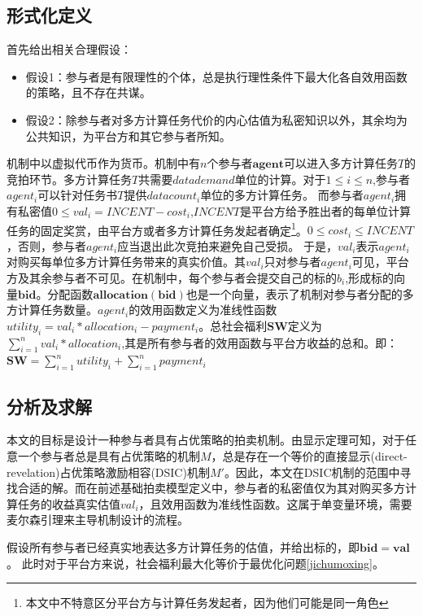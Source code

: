 \documentclass[promaster]{thesis-uestc}
\begin{document}
\subsection{形式化定义}
\label{jichumoxingdingyi}
首先给出相关合理假设：
\begin{itemize}
    \item 假设1：参与者是有限理性的个体，总是执行理性条件下最大化各自效用函数的策略，且不存在共谋。
    \item 假设2：除参与者对多方计算任务代价的内心估值为私密知识以外，其余均为公共知识，为平台方和其它参与者所知。
\end{itemize}

机制中以虚拟代币作为货币。机制中有$n$个参与者$\mathbf{agent}$可以进入多方计算任务$T$的竞拍环节。多方计算任务$T$共需要$datademand$单位的计算。对于$1\leq i\leq n$,参与者$agent_i$可以针对任务书$T$提供$datacount_i$单位的多方计算任务。
而参与者$agent_i$拥有私密值$0 \leq val_i = INCENT-cost_i$,$INCENT$是平台方给予胜出者的每单位计算任务的固定奖赏，由平台方或者多方计算任务发起者确定\footnote{本文中不特意区分平台方与计算任务发起者，因为他们可能是同一角色}。$0 \leq cost_i \leq INCENT$，否则，参与者$agent_i$应当退出此次竞拍来避免自己受损。 于是，$val_i$表示$agent_i$对购买每单位多方计算任务带来的真实价值。其$val_i$只对参与者$agent_i$可见，平台方及其余参与者不可见。在机制中，每个参与者会提交自己的标的$b_i$,形成标的向量$\mathbf{bid}$。分配函数$\mathbf{allocation}(\mathbf{bid})$也是一个向量，表示了机制对参与者分配的多方计算任务数量。$agent_i$的效用函数定义为准线性函数$utility_i = val_i*allocation_i-payment_i$。总社会福利$\mathbf{SW}$定义为$\sum_{i=1}^n{val_i*allocation_i}$,其是所有参与者的效用函数与平台方收益的总和。即：$\mathbf{SW} = \sum_{i=1}^n{utility_i}+\sum_{i=1}^{n}{payment_i}$

\subsection{分析及求解}
本文的目标是设计一种参与者具有占优策略的拍卖机制。由显示定理可知，对于任意一个参与者总是具有占优策略的机制$M$，总是存在一个等价的直接显示(direct-revelation)占优策略激励相容(DSIC)机制$M'$。因此，本文在DSIC机制的范围中寻找合适的解。而在前述基础拍卖模型定义中，参与者的私密值仅为其对购买多方计算任务的收益真实估值$val_i$，且效用函数为准线性函数。这属于单变量环境，需要麦尔森引理来主导机制设计的流程。

假设所有参与者已经真实地表达多方计算任务的估值，并给出标的，即$\mathbf{bid} = \mathbf{val}$。 此时对于平台方来说，社会福利最大化等价于最优化问题\ref{jichumoxing}。
\end{document}
